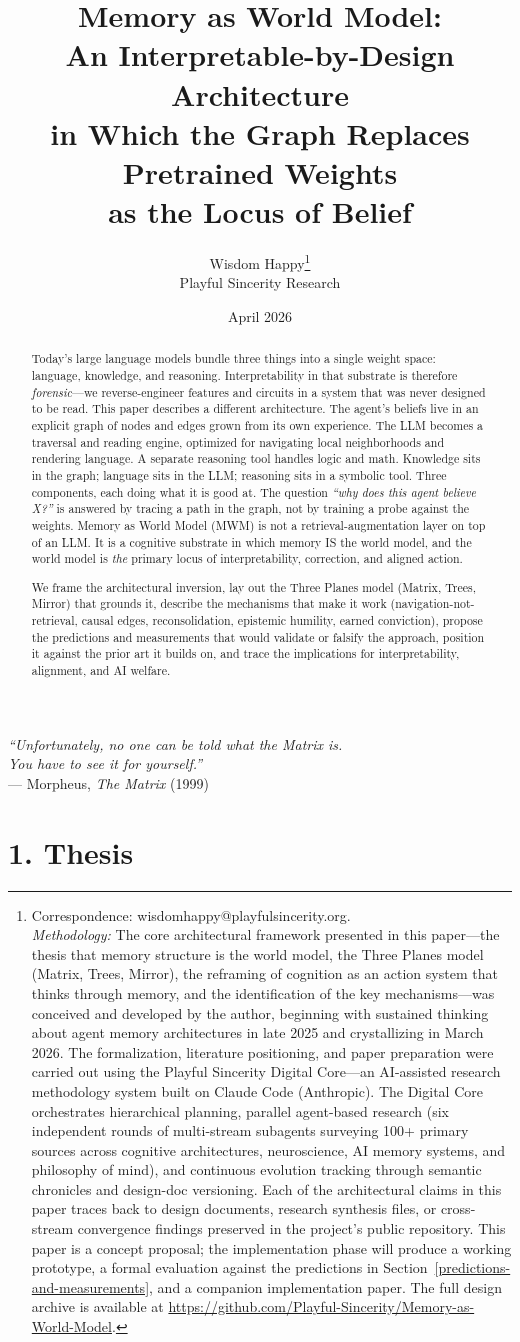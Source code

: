 \documentclass[12pt]{article}
\title{Memory as World Model: \\
An Interpretable-by-Design Architecture \\
in Which the Graph Replaces Pretrained Weights \\
as the Locus of Belief}
\author{Wisdom Happy\thanks{Correspondence: wisdomhappy@playfulsincerity.org. \\[0.5em]
\textit{Methodology:} The core architectural framework presented in this paper---the thesis that memory structure is the world model, the Three Planes model (Matrix, Trees, Mirror), the reframing of cognition as an action system that thinks through memory, and the identification of the key mechanisms---was conceived and developed by the author, beginning with sustained thinking about agent memory architectures in late 2025 and crystallizing in March 2026. The formalization, literature positioning, and paper preparation were carried out using the Playful Sincerity Digital Core---an AI-assisted research methodology system built on Claude Code (Anthropic). The Digital Core orchestrates hierarchical planning, parallel agent-based research (six independent rounds of multi-stream subagents surveying 100+ primary sources across cognitive architectures, neuroscience, AI memory systems, and philosophy of mind), and continuous evolution tracking through semantic chronicles and design-doc versioning. Each of the architectural claims in this paper traces back to design documents, research synthesis files, or cross-stream convergence findings preserved in the project's public repository. This paper is a concept proposal; the implementation phase will produce a working prototype, a formal evaluation against the predictions in Section~\ref{predictions-and-measurements}, and a companion implementation paper. The full design archive is available at \url{https://github.com/Playful-Sincerity/Memory-as-World-Model}.} \\[0.3em]
Playful Sincerity Research}
\date{April 2026}
\begin{document}
\maketitle

\begin{center}
\textit{``Unfortunately, no one can be told what the Matrix is. \\
You have to see it for yourself.''}\\[0.3em]
--- Morpheus, \textit{The Matrix} (1999)
\end{center}
\vspace{1em}

\begin{abstract}
\noindent
Today's large language models bundle three things into a single weight space: language, knowledge, and reasoning. Interpretability in that substrate is therefore \emph{forensic}---we reverse-engineer features and circuits in a system that was never designed to be read. This paper describes a different architecture. The agent's beliefs live in an explicit graph of nodes and edges grown from its own experience. The LLM becomes a traversal and reading engine, optimized for navigating local neighborhoods and rendering language. A separate reasoning tool handles logic and math. Knowledge sits in the graph; language sits in the LLM; reasoning sits in a symbolic tool. Three components, each doing what it is good at. The question \emph{``why does this agent believe X?''} is answered by tracing a path in the graph, not by training a probe against the weights. Memory as World Model (MWM) is not a retrieval-augmentation layer on top of an LLM. It is a cognitive substrate in which memory IS the world model, and the world model is \emph{the} primary locus of interpretability, correction, and aligned action.

We frame the architectural inversion, lay out the Three Planes model (Matrix, Trees, Mirror) that grounds it, describe the mechanisms that make it work (navigation-not-retrieval, causal edges, reconsolidation, epistemic humility, earned conviction), propose the predictions and measurements that would validate or falsify the approach, position it against the prior art it builds on, and trace the implications for interpretability, alignment, and AI welfare.
\end{abstract}

\vspace{1em}

\section{1. Thesis}\label{thesis}
\end{document}
